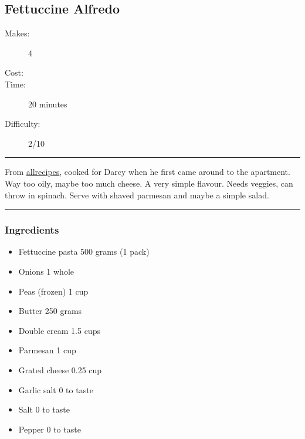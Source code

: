 \documentclass[]{article}
\begin{document}
\subsection*{\center\huge Fettuccine Alfredo}
\begin{description}
\item[Makes:] 4 
\item[Cost:] \textdollar
\item[Time:] 20 minutes
\item[Difficulty:] 2/10
\end{description}
\vspace{0.2cm}\hrule\vspace{0.5cm}
\begin{adjustwidth}{0.5 cm}{0.5 cm}

From \href{https://www.allrecipes.com/recipe/23431/to-die-for-fettuccine-alfredo/}{allrecipes}, cooked for Darcy when he first came around to the apartment. Way too oily, maybe too much cheese. A very simple flavour. Needs veggies, can throw in spinach. Serve with shaved parmesan and maybe a simple salad. \hfill{}\color{black}

\end{adjustwidth}
\vspace{0.5cm}\hrule
\subsubsection*{\Large Ingredients}
\begin{multicols}{2}
\begin{itemize}
 \item Fettuccine pasta \hfill 500 grams (1 pack)
 \item Onions \hfill 1 whole
 \item Peas (frozen) \hfill 1 cup
 \item Butter \hfill 250 grams
 \item Double cream \hfill 1.5 cups
 \item Parmesan \hfill 1 cup
 \item Grated cheese \hfill 0.25 cup
 \item Garlic salt \hfill 0 to taste
 \item Salt \hfill 0 to taste
 \item Pepper \hfill 0 to taste
\end{itemize}
\end{multicols}
\end{document}
